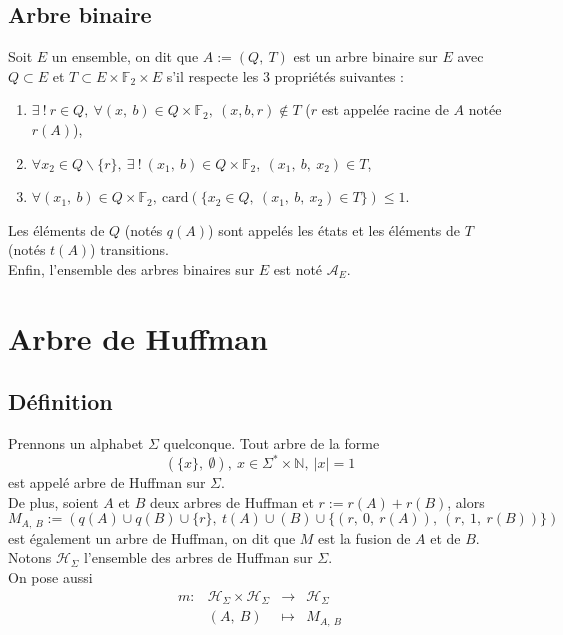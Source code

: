 \documentclass[a4paper, 12pt]{article}
\begin{document}
\subsection{Arbre binaire}
Soit $E$ un ensemble, on dit que $A := (Q,\ T)$ est un arbre binaire sur $E$ avec $Q \subset E$ et $T \subset E\times \mathbb{F}_2\times E$ s'il respecte les 3 propriétés suivantes :
\begin{enumerate}
\item $\exists \ !\ r \in Q,\ \forall (x,\ b) \in Q\times \mathbb{F}_2,\ (x, b, r) \notin T$ ($r$ est appelée racine de $A$ notée $r(A)$),
\item $\forall x_2 \in Q\backslash\{r\},\ \exists \ !\ (x_1,\ b) \in Q\times \mathbb{F}_2,\ (x_1,\ b,\ x_2) \in T$, %
\item $\forall (x_1,\ b) \in Q\times \mathbb{F}_2,\ \text{card}(\{x_2 \in Q,\ (x_1,\ b,\ x_2)\in T\}) \leq 1$.
\end{enumerate}
Les éléments de $Q$ (notés $q(A)$) sont appelés les états et les éléments de $T$ (notés $t(A)$) transitions. \\
Enfin, l'ensemble des arbres binaires sur $E$ est noté $\mathcal{A}_E$.
\newpage

\section{Arbre de Huffman}

\subsection{Définition}
Prennons un alphabet $\Sigma$ quelconque. Tout arbre de la forme
$$
(\{x\},\ \emptyset),\ x \in \Sigma^*\times \mathbb{N},\ |x| = 1
$$
est appelé arbre de Huffman sur $\Sigma$. \\
De plus, soient $A$ et $B$ deux arbres de Huffman et $r := r(A)+r(B)$, alors
$$
M_{A,\ B} := (q(A) \cup q(B) \cup \{r\},\ t(A)\cup(B)\cup \{(r,\ 0,\ r(A)),\ (r,\ 1,\ r(B))\})
$$
est également un arbre de Huffman, on dit que $M$ est la fusion de $A$ et de $
B$. \\
Notons $\mathcal{H}_\Sigma$ l'ensemble des arbres de Huffman sur $\Sigma$. \\
On pose aussi
$$
\begin{matrix}
m: &\mathcal{H}_\Sigma\times \mathcal{H}_\Sigma &\rightarrow &\mathcal{H}_\Sigma \\
&(A,\ B) &\mapsto &M_{A,\ B}
\end{matrix}
$$
\end{document}
